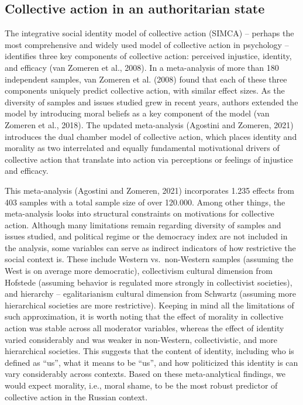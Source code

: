 \documentclass[
]{article}
\begin{document}
\subsection*{Collective action in an authoritarian state}\label{collective-action-in-an-authoritarian-state}

The integrative social identity model of collective action (SIMCA) -- perhaps the most comprehensive and widely used model of collective action in psychology -- identifies three key components of collective action: perceived injustice, identity, and efficacy (van Zomeren et al., 2008). In a meta-analysis of more than 180 independent samples, van Zomeren et al. (2008) found that each of these three components uniquely predict collective action, with similar effect sizes. As the diversity of samples and issues studied grew in recent years, authors extended the model by introducing moral beliefs as a key component of the model (van Zomeren et al., 2018). The updated meta-analysis (Agostini and Zomeren, 2021) introduces the dual chamber model of collective action, which places identity and morality as two interrelated and equally fundamental motivational drivers of collective action that translate into action via perceptions or feelings of injustice and efficacy.

This meta-analysis (Agostini and Zomeren, 2021) incorporates 1.235 effects from 403 samples with a total sample size of over 120.000. Among other things, the meta-analysis looks into structural constraints on motivations for collective action. Although many limitations remain regarding diversity of samples and issues studied, and political regime or the democracy index are not included in the analysis, some variables can serve as indirect indicators of how restrictive the social context is. These include Western vs.~non-Western samples (assuming the West is on average more democratic), collectivism cultural dimension from Hofstede (assuming behavior is regulated more strongly in collectivist societies), and hierarchy -- egalitarianism cultural dimension from Schwartz (assuming more hierarchical societies are more restrictive). Keeping in mind all the limitations of such approximation, it is worth noting that the effect of morality in collective action was stable across all moderator variables, whereas the effect of identity varied considerably and was weaker in non-Western, collectivistic, and more hierarchical societies. This suggests that the content of identity, including who is defined as ``us'', what it means to be ``us'', and how politicized this identity is can vary considerably across contexts. Based on these meta-analytical findings, we would expect morality, i.e., moral shame, to be the most robust predictor of collective action in the Russian context.
\end{document}
